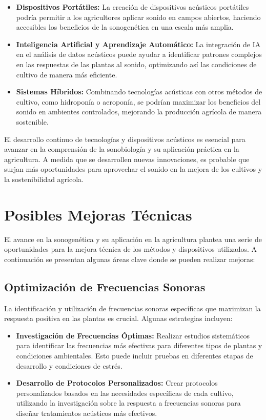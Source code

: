 \documentclass[twocolumn]{article}
\begin{document}
\begin{itemize}
    \item \textbf{Dispositivos Portátiles:} La creación de dispositivos acústicos portátiles podría permitir a los agricultores aplicar sonido en campos abiertos, haciendo accesibles los beneficios de la sonogenética en una escala más amplia.
    
    \item \textbf{Inteligencia Artificial y Aprendizaje Automático:} La integración de IA en el análisis de datos acústicos puede ayudar a identificar patrones complejos en las respuestas de las plantas al sonido, optimizando así las condiciones de cultivo de manera más eficiente.
    
    \item \textbf{Sistemas Híbridos:} Combinando tecnologías acústicas con otros métodos de cultivo, como hidroponía o aeroponía, se podrían maximizar los beneficios del sonido en ambientes controlados, mejorando la producción agrícola de manera sostenible.
\end{itemize}

El desarrollo continuo de tecnologías y dispositivos acústicos es esencial para avanzar en la comprensión de la sonobiología y su aplicación práctica en la agricultura. A medida que se desarrollen nuevas innovaciones, es probable que surjan más oportunidades para aprovechar el sonido en la mejora de los cultivos y la sostenibilidad agrícola.

\section{Posibles Mejoras Técnicas}

El avance en la sonogenética y su aplicación en la agricultura plantea una serie de oportunidades para la mejora técnica de los métodos y dispositivos utilizados. A continuación se presentan algunas áreas clave donde se pueden realizar mejoras:

\subsection{Optimización de Frecuencias Sonoras}

La identificación y utilización de frecuencias sonoras específicas que maximizan la respuesta positiva en las plantas es crucial. Algunas estrategias incluyen:

\begin{itemize}
    \item \textbf{Investigación de Frecuencias Óptimas:} Realizar estudios sistemáticos para identificar las frecuencias más efectivas para diferentes tipos de plantas y condiciones ambientales. Esto puede incluir pruebas en diferentes etapas de desarrollo y condiciones de estrés.
    
    \item \textbf{Desarrollo de Protocolos Personalizados:} Crear protocolos personalizados basados en las necesidades específicas de cada cultivo, utilizando la investigación sobre la respuesta a frecuencias sonoras para diseñar tratamientos acústicos más efectivos.
\end{itemize}
\end{document}
